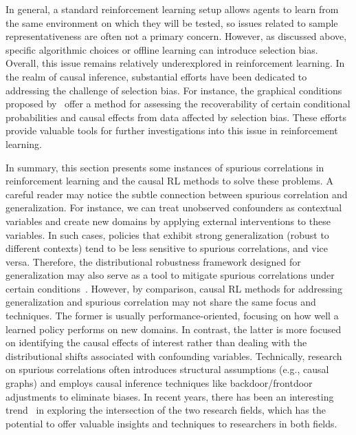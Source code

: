 \documentclass[10pt]{article} %
\theoremstyle{definition}
\begin{document}
In general, a standard reinforcement learning setup allows agents to learn from the same environment on which they will be tested, so issues related to sample representativeness are often not a primary concern. However, as discussed above, specific algorithmic choices or offline learning can introduce selection bias. Overall, this issue remains relatively underexplored in reinforcement learning. In the realm of causal inference, substantial efforts have been dedicated to addressing the challenge of selection bias. For instance, the graphical conditions proposed by~\citet{bareinboimRecoveringSelectionBias2014} offer a method for assessing the recoverability of certain conditional probabilities and causal effects from data affected by selection bias. These efforts provide valuable tools for further investigations into this issue in reinforcement learning.

In summary, this section presents some instances of spurious correlations in reinforcement learning and the causal RL methods to solve these problems. 
A careful reader may notice the subtle connection between spurious correlation and generalization. 
For instance, we can treat unobserved confounders as contextual variables and create new domains by applying external interventions to these variables. 
In such cases, policies that exhibit strong generalization (robust to different contexts) tend to be less sensitive to spurious correlations, and vice versa. 
Therefore, the distributional robustness framework designed for generalization may also serve as a tool to mitigate spurious correlations under certain conditions~\citep{dingSeeingNotBelieving2023}. 
However, by comparison, causal RL methods for addressing generalization and spurious correlation may not share the same focus and techniques. 
The former is usually performance-oriented, focusing on how well a learned policy performs on new domains. 
In contrast, the latter is more focused on identifying the causal effects of interest rather than dealing with the distributional shifts associated with confounding variables. 
Technically, research on spurious correlations often introduces structural assumptions (e.g., causal graphs) and employs causal inference techniques like backdoor/frontdoor adjustments to eliminate biases. 
In recent years, there has been an interesting trend~\citep{zhangDeepStableLearning2021,cuiStableLearningEstablishes2022a,dingSeeingNotBelieving2023} in exploring the intersection of the two research fields, which has the potential to offer valuable insights and techniques to researchers in both fields.
\end{document}
